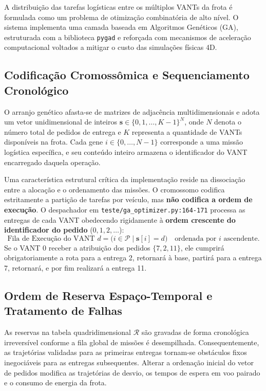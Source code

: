 A distribuição das tarefas logísticas entre os múltiplos VANTs da frota é formulada como um problema de otimização combinatória de alto nível. O sistema implementa uma camada baseada em Algoritmos Genéticos (GA), estruturada com a biblioteca \texttt{pygad} e reforçada com mecanismos de aceleração computacional voltados a mitigar o custo das simulações físicas 4D.

\subsection{Codificação Cromossômica e Sequenciamento Cronológico}

O arranjo genético afasta-se de matrizes de adjacência multidimensionais e adota um vetor unidimensional de inteiros $\mathbf{s} \in \{0, 1, \dots, K-1\}^N$, onde $N$ denota o número total de pedidos de entrega e $K$ representa a quantidade de VANTs disponíveis na frota. Cada gene $i \in \{0, \dots, N-1\}$ corresponde a uma missão logística específica, e seu conteúdo inteiro armazena o identificador do VANT encarregado daquela operação.

Uma característica estrutural crítica da implementação reside na dissociação entre a alocação e o ordenamento das missões. O cromossomo codifica estritamente a partição de tarefas por veículo, mas \textbf{não codifica a ordem de execução}. O despachador em \texttt{teste/ga\_optimizer.py:164-171} processa as entregas de cada VANT obedecendo rigidamente à \textbf{ordem crescente do identificador do pedido} ($0, 1, 2, \dots$):
\begin{equation}\label{eq:ordem_execucao}
\text{Fila de Execução do VANT } d = \big( i \in \mathcal{P} \;\big|\; \mathbf{s}[i] = d \big) \quad \text{ordenada por } i \text{ ascendente}.
\end{equation}
Se o VANT $0$ receber a atribuição dos pedidos $\{7, 2, 11\}$, ele cumprirá obrigatoriamente a rota para a entrega 2, retornará à base, partirá para a entrega 7, retornará, e por fim realizará a entrega 11.

\subsection{Ordem de Reserva Espaço-Temporal e Tratamento de Falhas}

As reservas na tabela quadridimensional $\mathcal{R}$ são gravadas de forma cronológica irreversível conforme a fila global de missões é desempilhada. Consequentemente, as trajetórias validadas para as primeiras entregas tornam-se obstáculos fixos inegociáveis para as entregas subsequentes. Alterar a ordenação inicial do vetor de pedidos modifica as trajetórias de desvio, os tempos de espera em voo pairado e o consumo de energia da frota.

